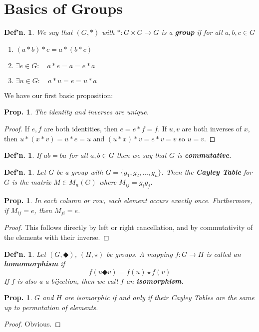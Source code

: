 \documentclass[12pt, a4paper]{book}
\newtheorem{definition}[theorem]{Def'n.}
\newtheorem{proposition}[theorem]{Prop.}
\theoremstyle{nonumberplain}
\newtheorem{proof}{Proof}
\begin{document}
\section{Basics of Groups}
\begin{definition}
    We say that $(G,*)$ with $*:G\times G\to G$ is a \textbf{group} if for all $a,b,c\in G$
    \begin{enumerate}
        \item $(a*b)*c=a*(b*c)$
        \item $\exists e\in G:\quad a*e=a=e*a$
        \item $\exists u\in G:\quad a*u=e=u*a$
    \end{enumerate}
\end{definition}
We have our first basic proposition:
\begin{proposition}
    The identity and inverses are unique.
\end{proposition}
\begin{proof}
    If $e,f$ are both identities, then $e=e*f=f$.
    If $u,v$ are both inverses of $x$, then $u*(x*v)=u*e=u$ and $(u*x)*v=e*v=v$ so $u=v$.
\end{proof}
\begin{definition}
    If $ab=ba$ for all $a,b\in G$ then we say that $G$ is \textbf{commutative}.
\end{definition}
\begin{definition}
    Let $G$ be a group with $G=\{g_1,g_2,\ldots,g_n\}$.
    Then the \textbf{Cayley Table} for $G$ is the matrix $M\in M_n(G)$ where $M_{ij}=g_ig_j$.
\end{definition}
\begin{proposition}
    In each column or row, each element occurs exactly once.
    Furthermore, if $M_{ij}=e$, then $M_{ji}=e$.
\end{proposition}
\begin{proof}
    This follows directly by left or right cancellation, and by commutativity of the elements with their inverse.
\end{proof}
\begin{definition}
    Let $(G,\Diamondblack)$, $(H,\star)$ be groups.
    A mapping $f:G\to H$ is called an \textbf{homomorphism} if
    \[f(u\Diamondblack v)=f(u)\star f(v)\]
    If $f$ is also a a bijection, then we call $f$ an \textbf{isomorphism}.
\end{definition}
\begin{proposition}
    $G$ and $H$ are isomorphic if and only if their Cayley Tables are the same up to permutation of elements.
\end{proposition}
\begin{proof}
    Obvious.
\end{proof}
\end{document}
